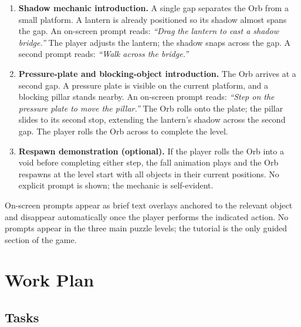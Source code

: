 \documentclass[11pt, letterpaper]{article}
\begin{document}
        \begin{enumerate}[leftmargin=1.5em, itemsep=4pt]
            \item \textbf{Shadow mechanic introduction.} A single gap
                  separates the Orb from a small platform. A lantern is
                  already positioned so its shadow almost spans the gap.
                  An on-screen prompt reads: \textit{``Drag the lantern to
                  cast a shadow bridge.''}  The player adjusts the lantern;
                  the shadow snaps across the gap.  A second prompt reads:
                  \textit{``Walk across the bridge.''} 

            \item \textbf{Pressure-plate and blocking-object introduction.}
                  The Orb arrives at a second gap. A pressure plate is
                  visible on the current platform, and a blocking pillar
                  stands nearby. An on-screen prompt reads: \textit{``Step
                  on the pressure plate to move the pillar.''}  The Orb
                  rolls onto the plate; the pillar slides to its second stop,
                  extending the lantern's shadow across the second gap.  The
                  player rolls the Orb across to complete the level.

            \item \textbf{Respawn demonstration (optional).}  If the player
                  rolls the Orb into a void before completing either step,
                  the fall animation plays and the Orb respawns at the level
                  start with all objects in their current positions.  No
                  explicit prompt is shown; the mechanic is self-evident.
        \end{enumerate}

        On-screen prompts appear as brief text overlays anchored to the
        relevant object and disappear automatically once the player performs
        the indicated action. No prompts appear in the three main puzzle
        levels; the tutorial is the only guided section of the game.

\section{Work Plan}

    \subsection{Tasks}
\end{document}
